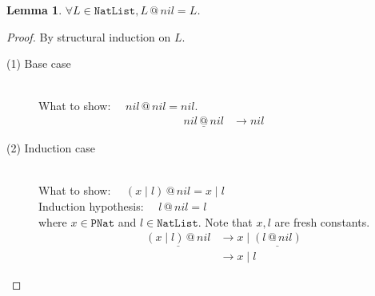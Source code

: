 \documentclass[12pt, a4paper]{article}
\newtheorem{lemma}[theorem]{Lemma}
\newcommand{\rel}[1]{\mathrel{#1}}
\newcommand{\larrow}{\longrightarrow}
\newcommand{\under}{\underline}
\begin{document}
\begin{lemma}
\label{lm2}
$\forall L \in \mathtt{NatList}, L \rel{@} nil = L$.
\end{lemma}
\begin{proof}
By structural induction on $L$.

\begin{description}

\item[(1) Base case]~\\
\noindent
What to show: $\quad nil \rel{@} nil = nil$.
\begin{align*}
\under{nil \rel{@} nil}
	&\larrow nil \tag{by @1}
\end{align*}

\item[(2) Induction case]~\\
What to show: $\quad (x \rel{|} l) \rel{@} nil = x \rel{|} l$ \\
Induction hypothesis: $\quad l \rel{@} nil = l$  \\
where $x \in \mathtt{PNat}$ and $l \in \mathtt{NatList}$. Note that $x, l$ are fresh constants.
\begin{align*}
\under{(x \rel{|} l) \rel{@} nil}
	&\larrow x \rel{|} \under{(l \rel{@} nil)} \tag{by @2} \\
	&\larrow x \rel{|} l \tag{by IH}
\end{align*}

\end{description}
\end{proof}
\end{document}

